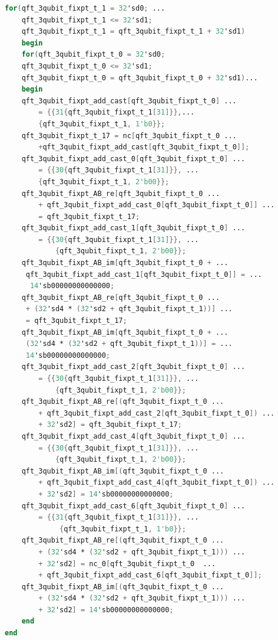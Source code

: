 \begin{lstlisting}[language=Verilog, caption={SystemVerilog code snippet for the QFT algorithm as generated by MATLAB HDL Coder corresponding to the description in \ref{lst:qft-elementwise}.}, label={lst:qft-sv}]
for(qft_3qubit_fixpt_t_1 = 32'sd0; ...
	qft_3qubit_fixpt_t_1 <= 32'sd1;
	qft_3qubit_fixpt_t_1 = qft_3qubit_fixpt_t_1 + 32'sd1) 
	begin
	for(qft_3qubit_fixpt_t_0 = 32'sd0;
	qft_3qubit_fixpt_t_0 <= 32'sd1;
	qft_3qubit_fixpt_t_0 = qft_3qubit_fixpt_t_0 + 32'sd1)...
	begin
	qft_3qubit_fixpt_add_cast[qft_3qubit_fixpt_t_0] ...
		= {{31{qft_3qubit_fixpt_t_1[31]}},...
		{qft_3qubit_fixpt_t_1, 1'b0}};
	qft_3qubit_fixpt_t_17 = nc[qft_3qubit_fixpt_t_0 ...
		+qft_3qubit_fixpt_add_cast[qft_3qubit_fixpt_t_0]];
	qft_3qubit_fixpt_add_cast_0[qft_3qubit_fixpt_t_0] ...
		= {{30{qft_3qubit_fixpt_t_1[31]}}, ...
		{qft_3qubit_fixpt_t_1, 2'b00}};
	qft_3qubit_fixpt_AB_re[qft_3qubit_fixpt_t_0 ...
		+ qft_3qubit_fixpt_add_cast_0[qft_3qubit_fixpt_t_0]] ...
		= qft_3qubit_fixpt_t_17;
	qft_3qubit_fixpt_add_cast_1[qft_3qubit_fixpt_t_0] ...
		= {{30{qft_3qubit_fixpt_t_1[31]}}, ... 
			{qft_3qubit_fixpt_t_1, 2'b00}};
	qft_3qubit_fixpt_AB_im[qft_3qubit_fixpt_t_0 + ...
	 qft_3qubit_fixpt_add_cast_1[qft_3qubit_fixpt_t_0]] = ...
	  14'sb00000000000000;
	qft_3qubit_fixpt_AB_re[qft_3qubit_fixpt_t_0 ...
	 + (32'sd4 * (32'sd2 + qft_3qubit_fixpt_t_1))] ...
	 = qft_3qubit_fixpt_t_17;
	qft_3qubit_fixpt_AB_im[qft_3qubit_fixpt_t_0 + ...
	 (32'sd4 * (32'sd2 + qft_3qubit_fixpt_t_1))] = ...
	 14'sb00000000000000;
	qft_3qubit_fixpt_add_cast_2[qft_3qubit_fixpt_t_0] ...
		= {{30{qft_3qubit_fixpt_t_1[31]}}, ... 
			{qft_3qubit_fixpt_t_1, 2'b00}};
	qft_3qubit_fixpt_AB_re[(qft_3qubit_fixpt_t_0 ...
		+ qft_3qubit_fixpt_add_cast_2[qft_3qubit_fixpt_t_0]) ...
		+ 32'sd2] = qft_3qubit_fixpt_t_17;
	qft_3qubit_fixpt_add_cast_4[qft_3qubit_fixpt_t_0] ...
		= {{30{qft_3qubit_fixpt_t_1[31]}}, ...
			{qft_3qubit_fixpt_t_1, 2'b00}};
	qft_3qubit_fixpt_AB_im[(qft_3qubit_fixpt_t_0 ...
		+ qft_3qubit_fixpt_add_cast_4[qft_3qubit_fixpt_t_0]) ...
		+ 32'sd2] = 14'sb00000000000000;
	qft_3qubit_fixpt_add_cast_6[qft_3qubit_fixpt_t_0] ...
		= {{31{qft_3qubit_fixpt_t_1[31]}}, ...
			 {qft_3qubit_fixpt_t_1, 1'b0}};
	qft_3qubit_fixpt_AB_re[(qft_3qubit_fixpt_t_0 ...
		+ (32'sd4 * (32'sd2 + qft_3qubit_fixpt_t_1))) ...
		+ 32'sd2] = nc_0[qft_3qubit_fixpt_t_0  ...
		+ qft_3qubit_fixpt_add_cast_6[qft_3qubit_fixpt_t_0]];
	qft_3qubit_fixpt_AB_im[(qft_3qubit_fixpt_t_0 ...
		+ (32'sd4 * (32'sd2 + qft_3qubit_fixpt_t_1))) ...
		+ 32'sd2] = 14'sb00000000000000;
	end
end
\end{lstlisting}
